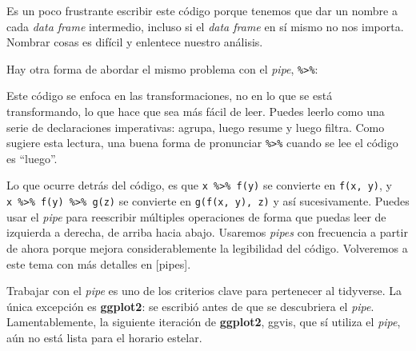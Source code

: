 \documentclass[11pt,oneside]{report}
\newenvironment{Shaded}{\begin{snugshade}}{\end{snugshade}}
\newcommand{\DataTypeTok}[1]{\textcolor[rgb]{0.13,0.29,0.53}{#1}}
\newcommand{\DecValTok}[1]{\textcolor[rgb]{0.00,0.00,0.81}{#1}}
\newcommand{\KeywordTok}[1]{\textcolor[rgb]{0.13,0.29,0.53}{\textbf{#1}}}
\newcommand{\NormalTok}[1]{#1}
\newcommand{\OperatorTok}[1]{\textcolor[rgb]{0.81,0.36,0.00}{\textbf{#1}}}
\newcommand{\OtherTok}[1]{\textcolor[rgb]{0.56,0.35,0.01}{#1}}
\newcommand{\StringTok}[1]{\textcolor[rgb]{0.31,0.60,0.02}{#1}}
\begin{document}
Es un poco frustrante escribir este código porque tenemos que dar un
nombre a cada \emph{data frame} intermedio, incluso si el \emph{data
frame} en sí mismo no nos importa. Nombrar cosas es difícil y enlentece
nuestro análisis.

Hay otra forma de abordar el mismo problema con el \emph{pipe},
\texttt{\%\textgreater{}\%}:

\begin{Shaded}
\end{Shaded}

Este código se enfoca en las transformaciones, no en lo que se está
transformando, lo que hace que sea más fácil de leer. Puedes leerlo como
una serie de declaraciones imperativas: agrupa, luego resume y luego
filtra. Como sugiere esta lectura, una buena forma de pronunciar
\texttt{\%\textgreater{}\%} cuando se lee el código es ``luego''.

Lo que ocurre detrás del código, es que
\texttt{x\ \%\textgreater{}\%\ f(y)} se convierte en \texttt{f(x,\ y)},
y \texttt{x\ \%\textgreater{}\%\ f(y)\ \%\textgreater{}\%\ g(z)} se
convierte en \texttt{g(f(x,\ y),\ z)} y así sucesivamente. Puedes usar
el \emph{pipe} para reescribir múltiples operaciones de forma que puedas
leer de izquierda a derecha, de arriba hacia abajo. Usaremos
\emph{pipes} con frecuencia a partir de ahora porque mejora
considerablemente la legibilidad del código. Volveremos a este tema con
más detalles en {[}pipes{]}.

Trabajar con el \emph{pipe} es uno de los criterios clave para
pertenecer al tidyverse. La única excepción es \textbf{ggplot2}: se
escribió antes de que se descubriera el \emph{pipe}. Lamentablemente, la
siguiente iteración de \textbf{ggplot2}, ggvis, que sí utiliza el
\emph{pipe}, aún no está lista para el horario estelar.
\end{document}
